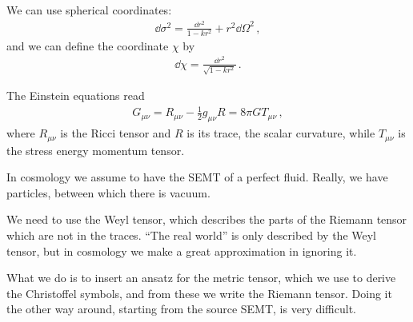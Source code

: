 \documentclass[main.tex]{subfiles}
\begin{document}
We can use spherical coordinates: 
%
\begin{align}
\dd{\sigma^2 } = \frac{ \dd{r^2}}{1 - k r^2} + r^2 \dd{\Omega^2}
\,,
\end{align}
%
and we can define the coordinate \(\chi \) by 
%
\begin{align}
\dd{\chi } = \frac{ \dd{r^2}}{\sqrt{1 - k r^2}}
\,.
\end{align}

The Einstein equations read 
%
\begin{align}
G_{\mu \nu } = R_{\mu \nu } - \frac{1}{2} g_{\mu \nu } R = 8 \pi G T_{\mu \nu }
\,,
\end{align}
%
where \(R_{\mu \nu }\) is the Ricci tensor and \(R\) is its trace, the scalar curvature, while \(T_{\mu \nu } \) is the stress energy momentum tensor. 

In cosmology we assume to have the SEMT of a perfect fluid. 
Really, we have particles, between which there is vacuum. 

We need to use the Weyl tensor, which describes the parts of the Riemann tensor which are not in the traces. 
``The real world'' is only described by the Weyl tensor, but in cosmology we make a great approximation in ignoring it. 

What we do is to insert an ansatz for the metric tensor, which we use to derive the Christoffel symbols, and from these we write the Riemann tensor. 
Doing it the other way around, starting from the source SEMT, is very difficult. 
\end{document}
